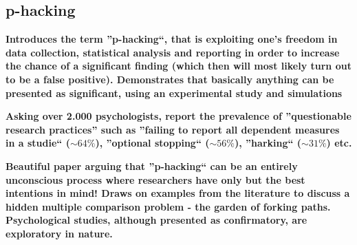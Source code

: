 \documentclass[12pt]{scrartcl}
\begin{document}
\subsection{p-hacking}
\begin{description}
  \item {}
  
  \textbf{Introduces the term ''p-hacking``, that is exploiting one's freedom in data collection, statistical analysis and reporting in order to increase the chance of a significant finding (which then will most likely turn out to be a false positive). Demonstrates that basically anything can be presented as significant, using an experimental study and simulations}
  
  \item {}
  
  \textbf{Asking over 2.000 psychologists, report the prevalence of ''questionable research practices'' such as ''failing to report all dependent measures in a studie`` ($\sim 64\%$), ''optional stopping`` ($\sim 56\%$), ''harking`` ($\sim 31\%$) etc.}
  
  \item {}
  
  \textbf{Beautiful paper arguing that ''p-hacking`` can be an entirely unconscious process where researchers have only but the best intentions in mind! Draws on examples from the literature to discuss a hidden multiple comparison problem - the garden of forking paths. Psychological studies, although presented as confirmatory, are exploratory in nature.}
\end{description}
\end{document}
